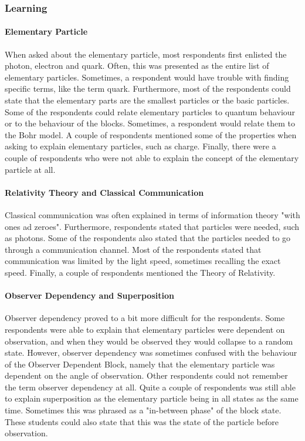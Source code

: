 \documentclass[11pt,twoside]{report} %
\begin{document}
\subsubsection{Learning}

\paragraph{Elementary Particle}

When asked about the elementary particle, most respondents first enlisted the photon, electron and quark. Often, this was presented as the entire list of elementary particles. Sometimes, a respondent would have trouble with finding specific terms, like the term quark. Furthermore, most of the respondents could state that the elementary parts are the smallest particles or the basic particles. Some of the respondents could relate elementary particles to quantum behaviour or to the behaviour of the blocks. Sometimes, a respondent would relate them to the Bohr model. A couple of respondents mentioned some of the properties when asking to explain elementary particles, such as charge. Finally, there were a couple of respondents who were not able to explain the concept of the elementary particle at all.

\paragraph{Relativity Theory and Classical Communication}

Classical communication was often explained in terms of information theory "with ones ad zeroes". Furthermore, respondents stated that particles were needed, such as photons. Some of the respondents also stated that the particles needed to go through a communication channel. Most of the respondents stated that communication was limited by the light speed, sometimes recalling the exact speed. Finally, a couple of respondents mentioned the Theory of Relativity.

\paragraph{Observer Dependency and Superposition}

Observer dependency proved to a bit more difficult for the respondents. Some respondents were able to explain that elementary particles were dependent on observation, and when they would be observed they would collapse to a random state. However, observer dependency was sometimes confused with the behaviour of the Observer Dependent Block, namely that the elementary particle was dependent on the angle of observation. Other respondents could not remember the term observer dependency at all. Quite a couple of respondents was still able to explain superposition as the elementary particle being in all states as the same time. Sometimes this was phrased as a "in-between phase" of the block state. These students could also state that this was the state of the particle before observation.
\end{document}
